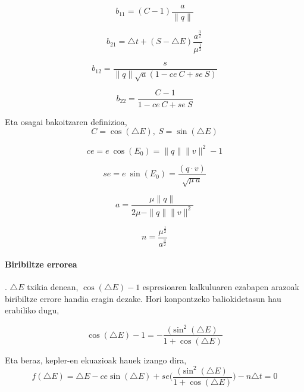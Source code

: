 \begin{equation*}
b_{11}=(C-1) \frac{a}{\|q\|}
\end{equation*}

\begin{equation*}
b_{21}=\triangle t+(S-\triangle E) \frac{a^{\frac{3}{2}}}{\mu^{\frac{1}{2}}}
\end{equation*}

\begin{equation*}
b_{12}=\frac{s}{\|q\| \sqrt{a} (1-ce \ C +se \ S)}
\end{equation*}

\begin{equation*}
b_{22}=\frac{C-1}{1-ce \ C+ se \ S}
\end{equation*}

Eta osagai bakoitzaren definizioa,
\begin{equation*}
C=\cos(\triangle E), \ S=\sin(\triangle E)
\end{equation*}

\begin{equation*}
ce=e \ \cos(E_0) = \|q\| \|v\|^2-1
\end{equation*}

\begin{equation*}
se= e \ \sin(E_0)=\frac{(q \cdot v)}{\sqrt{\mu \ a}}
\end{equation*}

\begin{equation*}
a= \frac{\mu \|q\|}{2\mu-\|q\|\|v\|^2}
\end{equation*}

\begin{equation*}
n= \frac{\mu^{\frac{1}{2}}}{a^{\frac{3}{2}}}
\end{equation*}

\paragraph*{\textbf{Biribiltze errorea}}. $\triangle E$ txikia denean, $\cos(\triangle E)-1$ espresioaren kalkuluaren ezabapen arazoak biribiltze errore handia eragin dezake. Hori konpontzeko baliokidetasun hau erabiliko dugu,

\begin{equation*}
\cos(\triangle E)-1=-\frac{(\sin^2(\triangle E)}{1+\cos(\triangle E)}
\end{equation*}  

Eta beraz, kepler-en ekuazioak hauek izango dira,
\begin{equation*}
f(\triangle E)=\triangle E - ce \sin(\triangle E)+ se \bigg(\frac{(\sin^2(\triangle E)}{1+\cos(\triangle E)}\bigg)-n \triangle t=0
\end{equation*}

